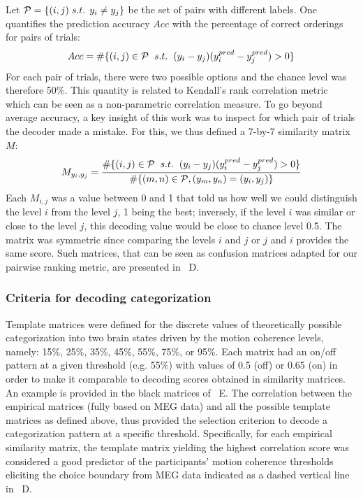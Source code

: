 Let $\mathcal{P}=\{(i,j) \hspace{1mm} s.t. \hspace{1.5mm} y_i \neq y_j\}$ be the set of pairs with different labels. One quantifies the prediction accuracy $Acc$ with the percentage of correct orderings for pairs of trials:
\begin{equation}
	Acc = \#\{(i,j) \in\mathcal{P} \hspace{2mm} s.t. \hspace{2mm} (y_i - y_j)(y_i^{pred} - y_j^{pred}) > 0 \}
\end{equation}
For each pair of trials, there were two possible options and the chance level was therefore 50\%. This quantity is related to Kendall’s rank correlation metric~\cite{46kruskal1958ordinal} which can be seen as a non-parametric correlation measure. To go beyond average accuracy, a key insight of this work was to inspect for which pair of trials the decoder made a mistake. For this, we thus defined a 7-by-7 similarity matrix $M$:
\begin{equation}
	M_{y_i,y_j} = \frac{\#\{(i,j)\in\mathcal{P} \hspace{2mm} s.t. \hspace{2mm} (y_i-y_j)(y_i^{pred}-y_j^{pred}) > 0\}}{\#\{(m,n)\in\mathcal{P}, (y_m, y_n) = (y_i, y_j)\}}
\end{equation}
Each $M_{i,j}$ was a value between 0 and 1 that told us how well we could distinguish the level $i$ from the level $j$, 1 being the best; inversely, if the level $i$ was similar or close to the level $j$, this decoding value would be close to chance level 0.5. The matrix was symmetric since comparing the levels $i$ and $j$ or $j$ and $i$  provides the same score. Such matrices, that can be seen as confusion matrices adapted for our pairwise ranking metric, are presented in ~D.

\subsubsection*{Criteria for decoding categorization}
Template matrices were defined for the discrete values of theoretically possible categorization into two brain states driven by the motion coherence levels, namely: 15\%, 25\%, 35\%, 45\%, 55\%, 75\%, or 95\%. Each matrix had an on/off pattern at a given threshold (e.g. 55\%) with values of 0.5 (off) or 0.65 (on) in order to make it comparable to decoding scores obtained in similarity matrices. An example is provided in the black matrices of ~E. The correlation between the empirical matrices (fully based on MEG data) and all the possible template matrices as defined above, thus provided the selection criterion to decode a categorization pattern at a specific threshold. Specifically, for each empirical similarity matrix, the template matrix yielding the highest correlation score was considered a good predictor of the participants' motion coherence thresholds eliciting the choice boundary from MEG data indicated as a dashed vertical line in ~D.

